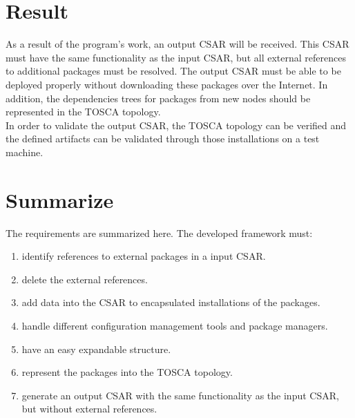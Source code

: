 \section*{Result}
As a result of the program's work, an output CSAR will be received.      
This CSAR must have the same functionality as the input CSAR, but all external references to additional packages must be resolved.
The output CSAR must be able to be deployed properly without downloading these packages over the Internet. 
In addition, the dependencies trees for packages from new nodes should be represented in the TOSCA topology. \\
In order to validate the output CSAR, the TOSCA topology can be verified and the defined artifacts can be validated through those installations on a test machine. 
\section*{Summarize}
The requirements are summarized here. 
The developed framework must:
\begin{enumerate}
	\item identify references to external packages in a input CSAR.\label{req:identify}
	\item delete the external references.\label{req:delete}
	\item add data into the CSAR to encapsulated installations of the packages.\label{req:adddata}
	\item handle different configuration management tools and package managers.\label{req:handledif}
	\item have an easy expandable structure.\label{req:expand}
	\item represent the packages into the TOSCA topology.\label{req:represent}
	\item generate an output CSAR with the same functionality as the input CSAR, but without external references.\label{req:out}
\end{enumerate}
